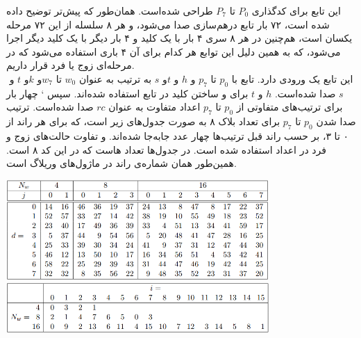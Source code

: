 این تابع برای کدگذاری $ P_0 $ تا $ P_7 $ طراحی شده‌است. همان‌طور که پیش‌تر توضیح داده شده است، ۷۲ بار تابع درهم‌سازی صدا می‌شود،‌ و هر ۸ سلسله از این ۷۲ مرحله یکسان است، هم‌چنین در هر ۸ سری ۴ بار با یک کلید و ۴ بار دیگر با یک کلید دیگر اجرا می‌شود،‌ که به همین دلیل این توابع  هر کدام برای آن ۴ باری استفاده می‌شود که در مرحله‌ای زوج یا فرد قرار داریم.
\\
این تابع یک ورودی   دارد. تابع  \hyperref[subsec:TFBIG-ADDKEY]{} با ‌$ p_0 $ تا  $ p_7 $ و $ h $ و $ t $و ‌$ s $ به ترتیب به عنوان  $ w_0 $ تا $ w_7 $و $ k $و ‌$ t $ و ‌$ s $ صدا شده‌است. ‌$ h $ و $ t $ برای  و ساختن کلید در تابع 
 استفاده شده‌اند.
سپس   
\hyperref[subsec:TFBIG-MIX8]{}`
چهار بار برای ترتیب‌های متفاوتی از ‌$ p_0 $ تا $ p_7 $ اعداد متفاوت به عنوان $ rc $ صدا شده‌است. ترتیب صدا شدن $ p_0 $ تا $ p_7 $ برای تعداد بلاک ۸ به صورت جدول‌های زیر است،‌ که برای هر ‌‌راند از ۰ تا ۳، بر حسب راند قبل ترتیب‌ها چهار عدد جابه‌جا شده‌اند. و تفاوت حالت‌های زوج و فرد در اعداد استفاده شده است. در جدول‌ها 
 تعداد 
هاست که در این کد ۸ است. همین‌طور  همان شماره‌‌ی راند در ماژول‌های وریلاگ است.
\begin{center}
	\includegraphics[width=10cm]{images/table_mix.png}
	\includegraphics[width= 10cm]{images/Mix2.png}
\end{center}


\subsection{}
\label{subsec:TFBIG-ADDKEY}

